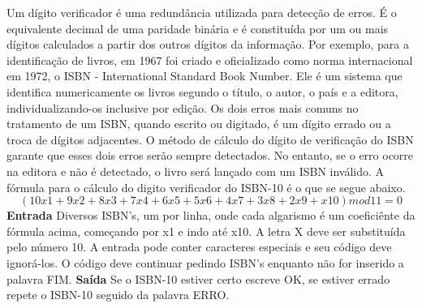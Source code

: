 \documentclass[a4paper, 12pt]{article}
\begin{document}
Um dígito verificador é uma redundância utilizada para detecção de erros. É o equivalente decimal de uma paridade binária e é constituída por um ou mais dígitos calculados a partir dos outros dígitos da informação. Por exemplo, para a identificação de livros, em 1967 foi criado e oficializado como norma internacional em 1972, o ISBN - International Standard Book Number. Ele é um sistema que identifica numericamente os livros segundo o título, o autor, o país e a editora, individualizando-os inclusive por edição.
Os dois erros mais comuns no tratamento de um ISBN, quando escrito ou digitado, é um dígito errado ou a troca de dígitos adjacentes. O método de cálculo do dígito de verificação do ISBN garante que esses dois erros serão sempre detectados. No entanto, se o erro ocorre na editora e não é detectado, o livro será lançado com um ISBN inválido.
A fórmula para o cálculo do digito verificador do ISBN-10 é o que se segue abaixo.
\newline
$$(10x1 + 9x2 + 8x3 + 7x4 + 6x5 + 5x6 + 4x7 + 3x8 + 2x9 + x10) mod 11 = 0$$
\newline \newline
\textbf{{\large Entrada}} \newline
Diversos ISBN's, um por linha, onde cada algarismo é um coeficiênte da fórmula acima, começando por x1 e indo até x10. 
\newline
A letra X deve ser substituída pelo número 10.
\newline
A entrada pode conter caracteres especiais e seu código deve ignorá-los.
\newline
O código deve continuar pedindo ISBN's enquanto não for inserido a palavra FIM.
\newline \newline
\textbf{{\large Saída}} \newline
Se o ISBN-10 estiver certo escreve OK, se estiver errado repete o ISBN-10 seguido da palavra ERRO.\newline
\newline \newline
\newline
\end{document}
